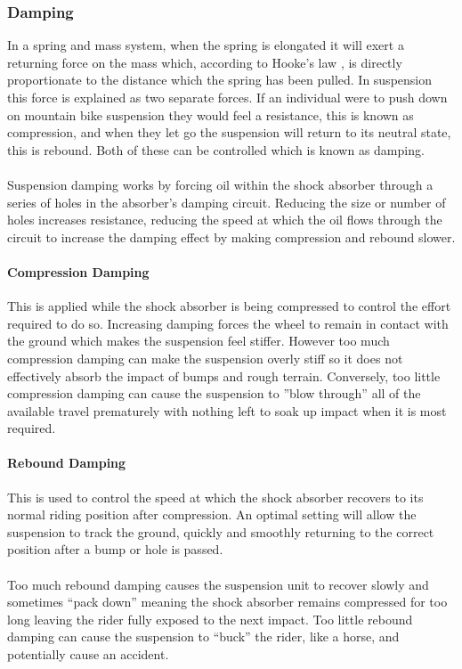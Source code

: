 	\subsubsection{Damping}
		In a spring and mass system, when the spring is elongated it will exert a returning force on the mass which, according to Hooke's law \citep{rychlewski1984hooke}, is directly proportionate to the distance which the spring has been pulled. In suspension this force is explained as two separate forces. If an individual were to push down on mountain bike suspension they would feel a resistance, this is known as compression, and when they let go the suspension will return to its neutral state, this is rebound. Both of these can be controlled which is known as damping.
		\\\\
		Suspension damping works by forcing oil within the shock absorber through a series of holes in the absorber’s damping circuit. Reducing the size or number	of holes increases resistance, reducing the speed at which the oil flows through the circuit to increase the damping effect by making compression and rebound slower.
	\paragraph{Compression Damping} 
		This is applied while the shock absorber is being compressed to control the effort required to do so. Increasing damping forces the wheel to remain in contact with the ground which makes the suspension feel stiffer. However too much compression damping can make the suspension overly stiff so it does not effectively absorb the impact of bumps and rough terrain. Conversely, too little compression damping can cause the suspension to ”blow through” all of the available travel prematurely with nothing left to soak up impact when it is most required. 
	\paragraph{Rebound Damping}
		This is used to control the speed at which the shock absorber recovers to its normal riding position after compression. An optimal setting will allow the suspension to track the ground, quickly and smoothly returning to the correct position after a bump or hole is passed. 
		\\\\
		Too much rebound damping causes the suspension unit to recover slowly and sometimes “pack down” meaning the shock absorber remains compressed for too long leaving the rider fully exposed to the next impact. Too little rebound damping can cause the suspension to “buck” the rider, like a horse, and potentially cause an accident.
